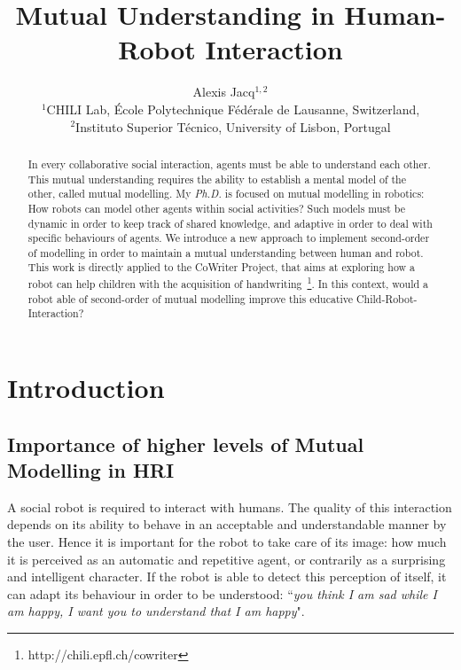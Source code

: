 \documentclass[10pt,a4paper]{article}
\begin{document}
\title{Mutual Understanding in Human-Robot Interaction}


\author{Alexis Jacq$^{1,2}$\\
$^1$CHILI Lab, \'Ecole Polytechnique F\'ed\'erale de Lausanne, Switzerland,\\
$^2$Instituto Superior T\'{e}cnico, University of Lisbon, Portugal}



\maketitle
\begin{abstract}
In every collaborative social interaction, agents must be able to understand each other. This mutual understanding requires the ability to establish a mental model of the other, called mutual modelling. 
My \textit{Ph.D.} is focused on mutual modelling in robotics: How robots can model other agents within social activities? Such models must be dynamic in order to keep track of shared knowledge, and adaptive in order to deal with specific behaviours of agents. We introduce a new approach to implement second-order of modelling in order to maintain a mutual understanding between human and robot. 
This work is directly applied to the CoWriter Project, that aims at exploring how a robot can help children with the acquisition of handwriting~\footnote{http://chili.epfl.ch/cowriter}. 
In this context, would a robot able of second-order of mutual modelling improve this educative Child-Robot-Interaction?
\end{abstract}


\section{Introduction}
\subsection{Importance of higher levels of Mutual Modelling in HRI}
A social robot is required to interact with humans. 
The quality of this interaction depends on its ability to behave in an acceptable and understandable manner by the user. 
Hence it is important for the robot to take care of its image: how much it is perceived as an automatic and repetitive agent, or contrarily as a surprising and intelligent character. If the robot is able to detect this perception of itself, it can adapt its behaviour in order to be understood: ``\textit{you think I am sad while I am happy, I want you to understand that I am happy}". 
\end{document}
